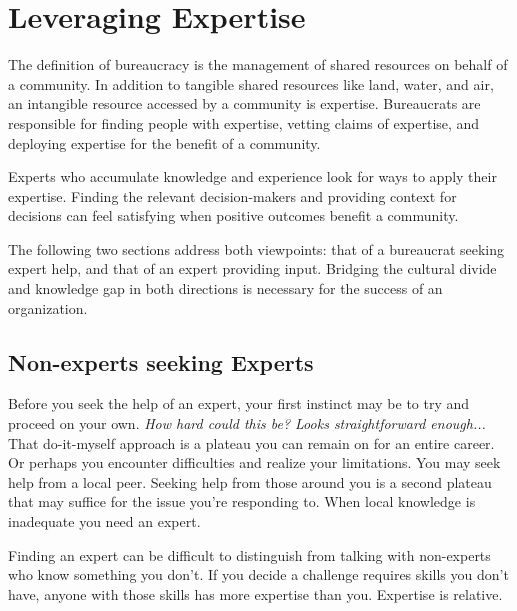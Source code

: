 \section{Leveraging Expertise\label{sec:expertise}}


The definition of \gls{bureaucracy} is the management of shared resources on behalf of a community. In addition to tangible shared resources like land, water, and air, an intangible resource accessed by a community is expertise. Bureaucrats are responsible for finding people with expertise, vetting claims of expertise, and deploying expertise for the benefit of a community. 

Experts who accumulate knowledge and experience look for ways to apply their expertise. Finding the relevant decision-makers and providing context for decisions can feel satisfying when positive  outcomes benefit a community. 


The following two sections address both viewpoints: that of a bureaucrat seeking expert help, and that of an expert providing input. Bridging the cultural divide and knowledge gap in both directions is necessary for the success of an organization.

\subsection*{Non-experts seeking Experts}

Before you seek the help of an expert, your first instinct may be to try and proceed on your own. \textit{How hard could this be? Looks straightforward enough...} That do-it-myself approach is a plateau you can remain on for an entire career. Or perhaps you encounter difficulties and realize your limitations. You may seek help from a local peer. Seeking help from those around you is a second plateau that may suffice for the issue you're responding to. When local knowledge is inadequate you need an expert.

Finding an expert can be difficult to distinguish from talking with non-experts who know something you don't. If you decide a challenge requires skills you don't have, anyone with those skills has more expertise than you. Expertise is relative. 

